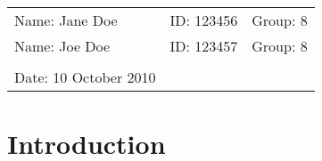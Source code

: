 \documentclass{article}
\begin{document}
\vspace*{0.25cm}

\hrulefill

\thispagestyle{empty}

\begin{center}
\begin{large}
\end{large}

\hrulefill

\vspace*{5cm}
\begin{Large}
\end{Large}

\vspace{2em}

\begin{large}
\end{large}
\end{center}


\vfill

\begin{table}[h!]
\flushleft
\begin{tabular}{lll}
Name: Jane Doe \hspace*{2em}&
ID: 123456\hspace*{2em}
& Group: 8\\

Name: Joe Doe \hspace*{2em}&
ID: 123457\hspace*{2em}
& Group: 8\\

\\

Date: 10 October 2010 

\end{tabular}
\end{table}

\hfill
\begin{tiny}
[rev. 2.0]
\end{tiny}
\newpage


\section{Introduction}
\end{document}

